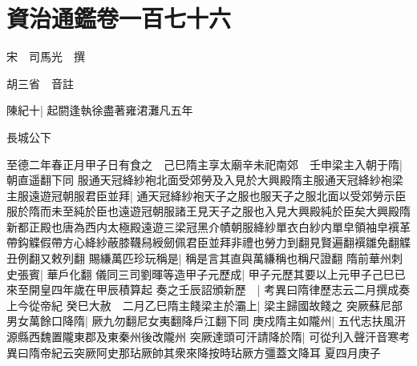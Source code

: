 \chapter{資治通鑑卷一百七十六}
宋　司馬光　撰

胡三省　音註

陳紀十|{
	起閼逢執徐盡著雍涒灘凡五年}


長城公下

至德二年春正月甲子日有食之　己巳隋主享太廟辛未祀南郊　壬申梁主入朝于隋|{
	朝直遥翻下同}
服通天冠絳紗袍北面受郊勞及入見於大興殿隋主服通天冠絳紗袍梁主服遠遊冠朝服君臣並拜|{
	通天冠絳紗袍天子之服也服天子之服北面以受郊勞示臣服於隋而未至純於臣也遠遊冠朝服諸王見天子之服也入見大興殿純於臣矣大興殿隋新都正殿也唐為西内太極殿遠遊三梁冠黑介幘朝服絳紗單衣白紗内單皁領袖皁襈革帶鈎䚢假帶方心絳紗蔽膝韈舄綬劒佩君臣並拜非禮也勞力到翻見賢遍翻襈雛免翻䚢丑例翻又敕列翻}
賜縑萬匹珍玩稱是|{
	稱是言其直與萬縑稱也稱尺證翻}
隋前華州刺史張賓|{
	華戶化翻}
儀同三司劉暉等造甲子元歷成|{
	甲子元歷其要以上元甲子己巳已來至開皇四年歲在甲辰積算起}
奏之壬辰詔頒新歷　|{
	考異曰隋律歷志云二月撰成奏上今從帝紀}
癸巳大赦　二月乙巳隋主餞梁主於灞上|{
	梁主歸國故餞之}
突厥蘇尼部男女萬餘口降隋|{
	厥九勿翻尼女夷翻降戶江翻下同}
庚戍隋主如隴州|{
	五代志扶風汧源縣西魏置隴東郡及東秦州後改隴州}
突厥達頭可汗請降於隋|{
	可從刋入聲汗音寒考異曰隋帝紀云突厥阿史那玷厥帥其衆來降按時玷厥方彊蓋文降耳}
夏四月庚子

